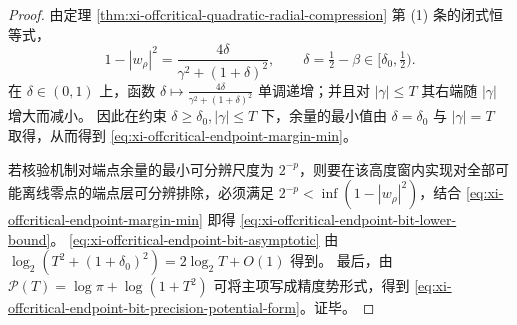 \begin{proof}
由定理 \ref{thm:xi-offcritical-quadratic-radial-compression} 第 (1) 条的闭式恒等式，
\[
1-|w_\rho|^2=\frac{4\delta}{\gamma^2+(1+\delta)^2},
\qquad \delta=\tfrac12-\beta\in[\delta_0,\tfrac12).
\]
在 \(\delta\in(0,1)\) 上，函数 \(\delta\mapsto \frac{4\delta}{\gamma^2+(1+\delta)^2}\) 单调递增；并且对 \(|\gamma|\le T\) 其右端随 \(|\gamma|\) 增大而减小。
因此在约束 \(\delta\ge\delta_0,|\gamma|\le T\) 下，余量的最小值由 \(\delta=\delta_0\) 与 \(|\gamma|=T\) 取得，从而得到 \eqref{eq:xi-offcritical-endpoint-margin-min}。
\par
若核验机制对端点余量的最小可分辨尺度为 \(2^{-p}\)，则要在该高度窗内实现对全部可能离线零点的端点层可分辨排除，必须满足 \(2^{-p}<\inf(1-|w_\rho|^2)\)，结合 \eqref{eq:xi-offcritical-endpoint-margin-min} 即得 \eqref{eq:xi-offcritical-endpoint-bit-lower-bound}。
\eqref{eq:xi-offcritical-endpoint-bit-asymptotic} 由 \(\log_2(T^2+(1+\delta_0)^2)=2\log_2 T+O(1)\) 得到。
最后，由 \(\mathcal{P}(T)=\log\pi+\log(1+T^2)\) 可将主项写成精度势形式，得到 \eqref{eq:xi-offcritical-endpoint-bit-precision-potential-form}。证毕。
\end{proof}

\endinput
